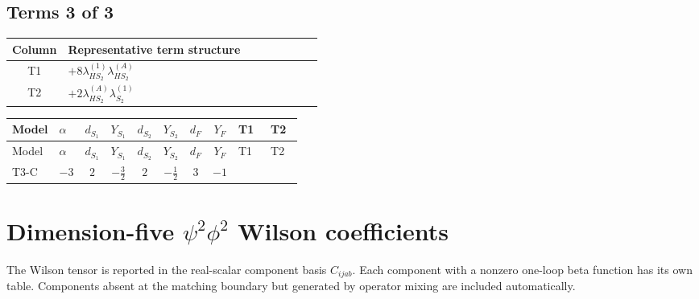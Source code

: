 \documentclass[8pt]{article}
\begin{document}
\begin{landscape}
\subsection*{Terms 3 of 3}
\begin{center}
\begin{tabular}{@{}c >{\raggedright\arraybackslash}p{0.82\linewidth}@{}}
\toprule
Column & Representative term structure \\
\midrule
T1 & \(\displaystyle +8 {\lambda_{HS_2}^{(1)}} {\lambda_{HS_2}^{(A)}}\) \\
\midrule
T2 & \(\displaystyle +2 {\lambda_{HS_2}^{(A)}} {\lambda_{S_2}^{(1)}}\) \\
\midrule
\bottomrule
\end{tabular}
\end{center}
\smallskip
\tiny
\begin{longtable}{@{}llcccccc >{\raggedright\arraybackslash}p{0.21\linewidth} >{\raggedright\arraybackslash}p{0.21\linewidth}@{}}
\toprule
Model & $\alpha$ & $d_{S_1}$ & $Y_{S_1}$ & $d_{S_2}$ & $Y_{S_2}$ & $d_F$ & $Y_F$ & T1 & T2 \\
\midrule
\endfirsthead
\toprule
Model & $\alpha$ & $d_{S_1}$ & $Y_{S_1}$ & $d_{S_2}$ & $Y_{S_2}$ & $d_F$ & $Y_F$ & T1 & T2 \\
\midrule
\endhead
T3-C & $-3$ & $2$ & $-\frac{3}{2}$ & $2$ & $-\frac{1}{2}$ & $3$ & $-1$ & \scriptsize\adjustbox{max width=\linewidth}{$\begin{gathered} +8 {\lambda_{HS_2}^{(1)}} {\lambda_{HS_2}^{(A)}}\end{gathered}$} & \scriptsize\adjustbox{max width=\linewidth}{$\begin{gathered} +2 {\lambda_{HS_2}^{(A)}} {\lambda_{S_2}^{(1)}}\end{gathered}$} \\
\midrule
\bottomrule
\end{longtable}
\clearpage
\section*{Dimension-five $\psi^2\phi^2$ Wilson coefficients}
The Wilson tensor is reported in the real-scalar component basis $C_{ijab}$. Each component with a nonzero one-loop beta function has its own table. Components absent at the matching boundary but generated by operator mixing are included automatically.

\end{landscape}
\end{document}
